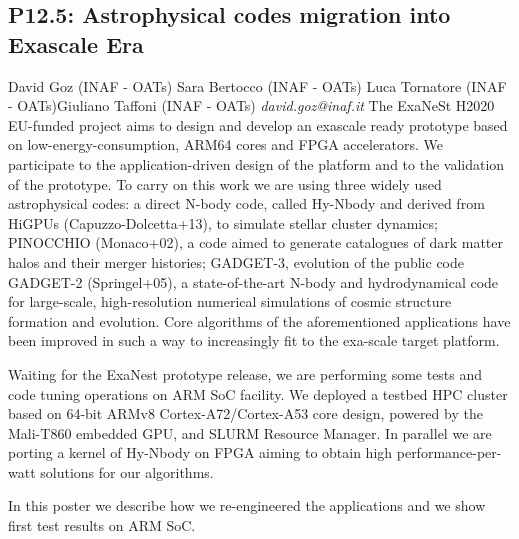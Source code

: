 \documentclass{report}
\begin{document}
\subsection*{P12.5: Astrophysical codes migration into Exascale Era}
\bigskip
David Goz (INAF - OATs) \newline Sara Bertocco (INAF - OATs) \newline  Luca Tornatore (INAF - OATs)\newline  Giuliano Taffoni (INAF - OATs)\newline  \newline  \newline\newline
{\it david.goz@inaf.it}\newline
\newline\newline
The ExaNeSt H2020 EU-funded project aims to design and develop an exascale ready prototype based on low-energy-consumption, ARM64 cores and FPGA accelerators. We participate to the application-driven design of the platform and to the validation of the prototype. To carry on this work we are using three widely used astrophysical codes: a direct N-body code, called Hy-Nbody and derived from HiGPUs (Capuzzo-Dolcetta+13), to simulate stellar cluster dynamics; PINOCCHIO (Monaco+02), a code aimed to generate catalogues of dark matter halos and their merger histories; GADGET-3, evolution of the public code GADGET-2 (Springel+05), a state-of-the-art N-body and hydrodynamical code for large-scale, high-resolution numerical simulations of cosmic structure formation and evolution. Core algorithms of the aforementioned applications have been improved in such a way to increasingly fit to the exa-scale target platform.

Waiting for the ExaNest prototype release, we are performing some tests and code tuning operations on ARM SoC facility. We deployed a testbed HPC cluster based on 64-bit ARMv8 Cortex-A72/Cortex-A53 core design, powered by the Mali-T860 embedded GPU, and SLURM Resource Manager. In parallel we are porting a kernel of Hy-Nbody on FPGA aiming to obtain high performance-per-watt solutions for our algorithms.

In this poster we describe how we re-engineered the applications and we show first test results on ARM SoC.\newline
\newpage
\end{document}
